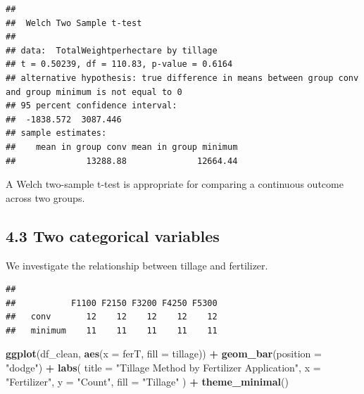 \documentclass[
]{article}
\newenvironment{Shaded}{\begin{snugshade}}{\end{snugshade}}
\newcommand{\AttributeTok}[1]{\textcolor[rgb]{0.13,0.29,0.53}{#1}}
\newcommand{\FunctionTok}[1]{\textcolor[rgb]{0.13,0.29,0.53}{\textbf{#1}}}
\newcommand{\NormalTok}[1]{#1}
\newcommand{\SpecialCharTok}[1]{\textcolor[rgb]{0.81,0.36,0.00}{\textbf{#1}}}
\newcommand{\StringTok}[1]{\textcolor[rgb]{0.31,0.60,0.02}{#1}}
\begin{document}
\begin{verbatim}
## 
##  Welch Two Sample t-test
## 
## data:  TotalWeightperhectare by tillage
## t = 0.50239, df = 110.83, p-value = 0.6164
## alternative hypothesis: true difference in means between group conv and group minimum is not equal to 0
## 95 percent confidence interval:
##  -1838.572  3087.446
## sample estimates:
##    mean in group conv mean in group minimum 
##              13288.88              12664.44
\end{verbatim}

A Welch two-sample t-test is appropriate for comparing a continuous
outcome across two groups.

\subsection{4.3 Two categorical
variables}\label{two-categorical-variables}

We investigate the relationship between tillage and fertilizer.

\begin{Shaded}
\end{Shaded}

\begin{verbatim}
##          
##           F1100 F2150 F3200 F4250 F5300
##   conv       12    12    12    12    12
##   minimum    11    11    11    11    11
\end{verbatim}

\begin{Shaded}
\begin{Highlighting}[]
\FunctionTok{ggplot}\NormalTok{(df\_clean, }\FunctionTok{aes}\NormalTok{(}\AttributeTok{x =}\NormalTok{ ferT, }\AttributeTok{fill =}\NormalTok{ tillage)) }\SpecialCharTok{+}
  \FunctionTok{geom\_bar}\NormalTok{(}\AttributeTok{position =} \StringTok{"dodge"}\NormalTok{) }\SpecialCharTok{+}
  \FunctionTok{labs}\NormalTok{(}
    \AttributeTok{title =} \StringTok{"Tillage Method by Fertilizer Application"}\NormalTok{,}
    \AttributeTok{x =} \StringTok{"Fertilizer"}\NormalTok{,}
    \AttributeTok{y =} \StringTok{"Count"}\NormalTok{,}
    \AttributeTok{fill =} \StringTok{"Tillage"}
\NormalTok{  ) }\SpecialCharTok{+}
  \FunctionTok{theme\_minimal}\NormalTok{()}
\end{Highlighting}
\end{Shaded}
\end{document}
